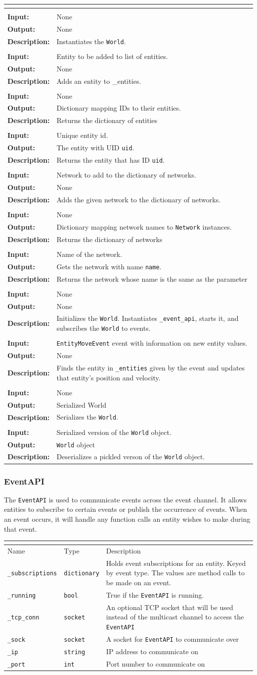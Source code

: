\documentclass[titlepage]{article}
\newcommand{\operations}[1]{
\begin{center}
    \begin{longtable}{|p{4cm}|p{10cm + 2.0\tabcolsep}|}
    \hline
    \multicolumn{2}{|l|}{\cellcolor[gray]{0.5}{\textbf{Operations}}} \\ \hline
#1
    \end{longtable}
\end{center}
}
\newcommand{\operation}[4]{
    \hline
    \multicolumn{2}{|l|}{\cellcolor[gray]{0.8}{\texttt{#1}}} \\ \hline
    \hspace{7pt}\textbf{Input:} & #2 \\ \hline
    \hspace{7pt}\textbf{Output:} & #3 \\ \hline
    \hspace{7pt}\textbf{Description:} & #4 \\ \hline
}
\newcommand{\attributes}[1]{
    \begin{center}
        \begin{tabular}{|p{3cm}|p{3cm}|p{8cm}|}
            \multicolumn{3}{|l|}{\cellcolor[gray]{0.5}{\textbf{Attributes}}} \\ \hline
            \rowcolor[gray]{0.8} Name & Type & Description \\ \hline 
            #1
        \end{tabular}
    \end{center}
}
\newcommand{\attribute}[3]{
    \texttt{#1} & \texttt{#2} & #3 \\ \hline
}
\begin{document}
\operations{
    \operation{\_\_init\_\_()}{None}{None}{Instantiates the \texttt{World}.}
    \operation{add\_entity(entity)}{Entity to be added to list of entities.}{None}{Adds an entity to \_entities.}
    \operation{get\_entities()}{None}{Dictionary mapping IDs to their entities.}{Returns the dictionary of entities}
    \operation{get\_entity(uid)}{Unique entity id.}{The entity with UID \texttt{uid}.}{Returns the entity that has ID \texttt{uid}.}
    \operation{add\_network(network)}{Network to add to the dictionary of networks.}{None}{Adds the given network to the dictionary of networks. }
    \operation{get\_networks()}{None}{Dictionary mapping network names to \texttt{Network} instances.}{Returns the dictionary of networks}
    \operation{get\_network(name)}{Name of the network.}{Gets the network with name \texttt{name}.}{Returns the network whose name is the same as the parameter}
    \operation{initialize()}{None}{None}{Initializes the \texttt{World}. Instantiates \texttt{\_event\_api}, starts it, and subscribes the \texttt{World} to events.}
    \operation{\_on\_entity\_move(event)}{\texttt{EntityMoveEvent} event with information on new entity values.}{None}{Finds the entity in \texttt{\_entities} given by the event and updates that entity's position and velocity.}
    \operation{pickle()}{None}{Serialized World}{Serializes the \texttt{World}.}
    \operation{from\_pickle(pickled)}{Serialized version of the \texttt{World} object.}{\texttt{World} object}{Deserializes a pickled verson of the \texttt{World} object.}
}
    
\subsubsection{EventAPI}
{The \texttt{EventAPI} is used to communicate events across the event channel. It allows entities to subscribe to certain events or publish the occurrence of events. When an event occurs, it will handle any function calls an entity wishes to make during that event.}

\attributes{
    \attribute{\_subscriptions}{dictionary}{Holds event subscriptions for an entity. Keyed by event type. The values are method calls to be made on an event.}
    \attribute{\_running}{bool}{True if the \texttt{EventAPI} is running.}
    \attribute{\_tcp\_conn}{socket}{An optional TCP socket that will be used instead of the multicast channel to access the \texttt{EventAPI}}
    \attribute{\_sock}{socket}{A socket for \texttt{EventAPI} to communicate over}
    \attribute{\_ip}{string}{IP address to communicate on}
    \attribute{\_port}{int}{Port number to communicate on}
}
\end{document}

